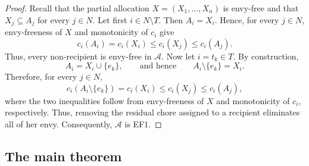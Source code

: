 
\begin{proof}
Recall that the partial allocation $X=(X_1,\ldots,X_n)$ is envy-free and that $X_j\subseteq A_j$ for every $j\in N$. Let first $i\in N\setminus T$. Then $A_i=X_i$. Hence, for every $j\in N$, envy-freeness of $X$ and monotonicity of $c_i$ give
\[
    c_i(A_i)
    =
    c_i(X_i)
    \leq
    c_i(X_j)
    \leq
    c_i(A_j).
\]
Thus, every non-recipient is envy-free in $\mathcal{A}$. Now let $i=t_k\in T$. By construction,
\[
    A_i=X_i\cup\{e_k\},
    \qquad\text{and hence}\qquad
    A_i\setminus\{e_k\}=X_i.
\]
Therefore, for every $j\in N$,
\[
    c_i(A_i\setminus\{e_k\})
    =
    c_i(X_i)
    \leq
    c_i(X_j)
    \leq
    c_i(A_j),
\]
where the two inequalities follow from envy-freeness of $X$ and monotonicity of $c_i$, respectively. Thus, removing the residual chore assigned to a recipient eliminates all of her envy. Consequently, $\mathcal{A}$ is EF1.
\end{proof}%
\subsection{The main theorem}
\label{sec:m-main}



